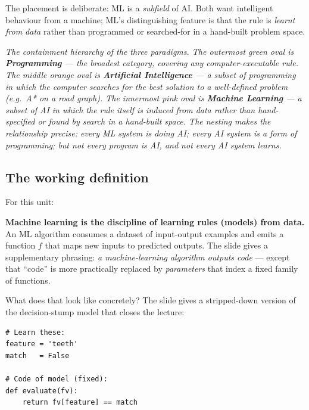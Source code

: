 \documentclass[11pt, a4paper]{article}
\begin{document}
\begin{notebox}
The placement is deliberate: ML is a \emph{subfield} of AI. Both want intelligent behaviour from a machine; ML's distinguishing feature is that the rule is \emph{learnt from data} rather than programmed or searched-for in a hand-built problem space.
\end{notebox}

\begin{center}

\footnotesize\textit{The containment hierarchy of the three paradigms. The outermost green oval is \textbf{Programming} --- the broadest category, covering any computer-executable rule. The middle orange oval is \textbf{Artificial Intelligence} --- a subset of programming in which the computer searches for the best solution to a well-defined problem (e.g.\ A* on a road graph). The innermost pink oval is \textbf{Machine Learning} --- a subset of AI in which the rule itself is \emph{induced from data} rather than hand-specified or found by search in a hand-built space. The nesting makes the relationship precise: every ML system is doing AI; every AI system is a form of programming; but not every program is AI, and not every AI system learns.}
\end{center}

\subsection{The working definition}

For this unit:

\begin{defbox}
\textbf{Machine learning is the discipline of learning rules (models) from data.} An ML algorithm consumes a dataset of input-output examples and emits a function $f$ that maps new inputs to predicted outputs. The slide gives a supplementary phrasing: \emph{a machine-learning algorithm outputs code} — except that ``code'' is more practically replaced by \emph{parameters} that index a fixed family of functions.
\end{defbox}

What does that look like concretely? The slide gives a stripped-down version of the decision-stump model that closes the lecture:

\begin{verbatim}
# Learn these:
feature = 'teeth'
match   = False

# Code of model (fixed):
def evaluate(fv):
    return fv[feature] == match
\end{verbatim}
\end{document}
